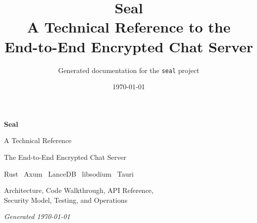 \documentclass[11pt]{report}
\title{\Huge\bfseries Seal\\[0.4em]\Large A Technical Reference to the\\End-to-End Encrypted Chat Server}
\author{Generated documentation for the \texttt{seal} project}
\date{\today}
\begin{document}
\begin{titlepage}
\centering
\vspace*{3cm}
{\Huge\bfseries\color{sealblue} Seal\par}
\vspace{0.6cm}
{\Large A Technical Reference\par}
\vspace{0.3cm}
{\large The End-to-End Encrypted Chat Server\par}
\vspace{2cm}
{\large Rust \textbullet\ Axum \textbullet\ LanceDB \textbullet\ libsodium \textbullet\ Tauri\par}
\vfill
{\large Architecture, Code Walkthrough, API Reference,\\Security Model, Testing, and Operations\par}
\vspace{2cm}
{\itshape Generated \today\par}
\end{titlepage}

\tableofcontents












\end{document}

